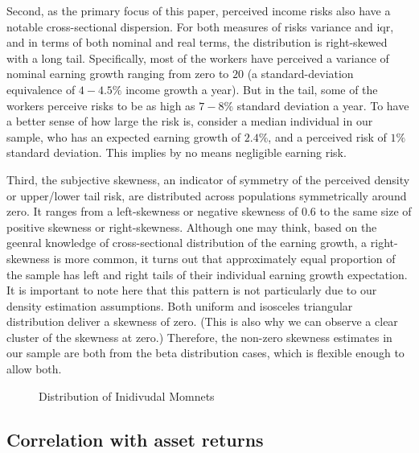 \documentclass[12pt,notitlepage,onecolumn,aps,pra]{article}
\begin{document}
Second, as the primary focus of this paper, perceived income risks also
have a notable cross-sectional dispersion. For both measures of risks
variance and iqr, and in terms of both nominal and real terms, the
distribution is right-skewed with a long tail. Specifically, most of the
workers have perceived a variance of nominal earning growth ranging from
zero to \(20\) (a standard-deviation equivalence of \(4-4.5\%\) income
growth a year). But in the tail, some of the workers perceive risks to
be as high as \(7-8\%\) standard deviation a year. To have a better
sense of how large the risk is, consider a median individual in our
sample, who has an expected earning growth of \(2.4\%\), and a perceived
risk of \(1\%\) standard deviation. This implies by no means negligible
earning risk.

Third, the subjective skewness, an indicator of symmetry of the
perceived density or upper/lower tail risk, are distributed across
populations symmetrically around zero. It ranges from a left-skewness or
negative skewness of 0.6 to the same size of positive skewness or
right-skewness. Although one may think, based on the geenral knowledge
of cross-sectional distribution of the earning growth, a right-skewness
is more common, it turns out that approximately equal proportion of the
sample has left and right tails of their individual earning growth
expectation. It is important to note here that this pattern is not
particularly due to our density estimation assumptions. Both uniform and
isosceles triangular distribution deliver a skewness of zero. (This is
also why we can observe a clear cluster of the skewness at zero.)
Therefore, the non-zero skewness estimates in our sample are both from
the beta distribution cases, which is flexible enough to allow both.


    \begin{figure}[!ht]
        \begin{center}\end{center}
        \caption{Distribution of Inidivudal Momnets}
        \label{fig:histmoms}
    \end{figure}
    
    \hypertarget{correlation-with-asset-returns}{%
\subsection{Correlation with asset
returns}\label{correlation-with-asset-returns}}
\end{document}
